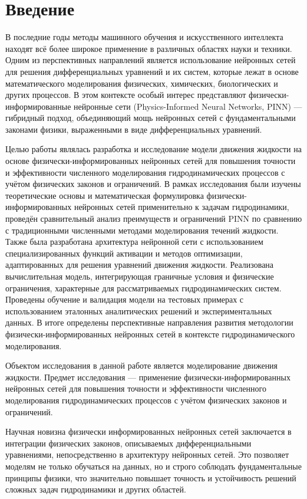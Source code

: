 \chapter*{Введение}

В последние годы методы машинного обучения и искусственного интеллекта находят всё
более широкое применение в различных областях науки и техники. Одним из перспективных
направлений является использование нейронных сетей для решения дифференциальных
уравнений и их систем, которые лежат в основе математического моделирования физических,
химических, биологических и других процессов. В этом контексте особый интерес представляют
физически-информированные нейронные сети (Physics-Informed Neural Networks, PINN) ---
гибридный подход, объединяющий мощь нейронных сетей с фундаментальными законами физики,
выраженными в виде дифференциальных уравнений.

Целью работы являлась разработка и исследование модели движения жидкости на основе
физически-информированных нейронных сетей для повышения точности и эффективности
численного моделирования гидродинамических процессов с учётом физических законов и
ограничений. В рамках исследования были изучены теоретические основы и математическая
формулировка физически-информированных нейронных сетей применительно к задачам
гидродинамики, проведён сравнительный анализ преимуществ и ограничений PINN по
сравнению с традиционными численными методами моделирования течений жидкости. Также
была разработана архитектура нейронной сети с использованием специализированных функций
активации и методов оптимизации, адаптированных для решения уравнений движения жидкости.
Реализована вычислительная модель, интегрирующая граничные условия и физические ограничения,
характерные для рассматриваемых гидродинамических систем. Проведены обучение и валидация
модели на тестовых примерах с использованием эталонных аналитических решений и
экспериментальных данных. В итоге определены перспективные направления развития
методологии физически-информированных нейронных сетей в контексте гидродинамического
моделирования.

Объектом исследования в данной работе является моделирование движения жидкости.
Предмет исследования — применение физически-информированных нейронных сетей
для повышения точности и эффективности численного моделирования гидродинамических
процессов с учётом физических законов и ограничений.

Научная новизна физически информированных нейронных сетей заключается в интеграции
физических законов, описываемых дифференциальными уравнениями, непосредственно в
архитектуру нейронных сетей. Это позволяет моделям не только обучаться на данных,
но и строго соблюдать фундаментальные принципы физики, что значительно повышает
точность и устойчивость решений сложных задач гидродинамики и других областей.

